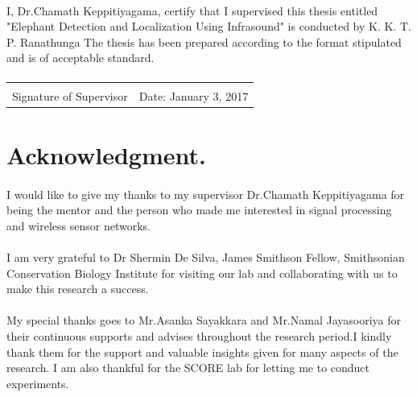 \documentclass[12pt]{article}
\numberwithin{figure}{section}
\numberwithin{table}{section}
\begin{document}
\paragraph{}
\paragraph{}
I, Dr.Chamath Keppitiyagama, certify that I supervised this thesis entitled "Elephant Detection and Localization Using Infrasound" is conducted by K. K. T. P. Ranathunga The thesis has been prepared according to
the format stipulated and is of acceptable standard.
\paragraph{}
\paragraph{}
\noindent
\begin{tabular}{ll}
		\makebox[2.5in]{\hrulefill} \\
			Signature of Supervisor & Date: January 3, 2017\\		
\end{tabular}
		
\newpage
\section*{Acknowledgment.}
\paragraph{}
I would like to give my thanks to my supervisor Dr.Chamath Keppitiyagama
for being the mentor and the person who made me interested in signal processing and wireless sensor networks.

\paragraph{}
I am very grateful to Dr Shermin De Silva, James Smithson Fellow, Smithsonian Conservation Biology Institute for visiting our lab and collaborating with us to make this research a success.

\paragraph{}
My special thanks goes to Mr.Asanka Sayakkara and Mr.Namal Jayasooriya for their continuous supports and advises throughout the research period.I kindly thank them for the
support and valuable insights given for many aspects of the research.
I am also thankful for the SCORE lab for letting me to conduct experiments.
\end{document}

